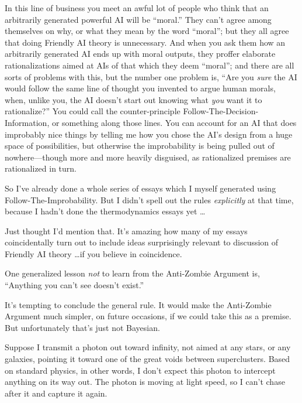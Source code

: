 {
 In this line of business you meet an awful lot of people who think
that an arbitrarily generated powerful AI will be
``moral.'' They
can't agree among themselves on why, or what they mean
by the word ``moral''; but they all
agree that doing Friendly AI theory is unnecessary. And when you ask
them how an arbitrarily generated AI ends up with moral outputs, they
proffer elaborate rationalizations aimed at AIs of that which they deem
``moral''; and there are all sorts
of problems with this, but the number one problem is,
``Are you \textit{sure} the AI would follow the same
line of thought you invented to argue human morals, when, unlike you,
the AI doesn't start out knowing what \textit{you} want
it to rationalize?'' You could call the
counter-principle Follow-The-Decision-Information, or something along
those lines. You can account for an AI that does improbably nice things
by telling me how you chose the AI's design from a huge
space of possibilities, but otherwise the improbability is being pulled
out of nowhere---though more and more heavily disguised, as
rationalized premises are rationalized in turn.}

{
 So I've already done a whole series of essays
which I myself generated using Follow-The-Improbability. But I
didn't spell out the rules \textit{explicitly} at that
time, because I hadn't done the thermodynamics essays
yet \ldots}

{
 Just thought I'd mention that.
It's amazing how many of my essays coincidentally turn
out to include ideas surprisingly relevant to discussion of Friendly AI
theory \ldots if you believe in coincidence.}

\myendsectiontext


\bigskip


{
 One generalized lesson \textit{not} to learn from the Anti-Zombie
Argument is, ``Anything you can't see
doesn't exist.'' }

{
 It's tempting to conclude the general rule. It
would make the Anti-Zombie Argument much simpler, on future occasions,
if we could take this as a premise. But unfortunately
that's just not Bayesian.}

{
 Suppose I transmit a photon out toward infinity, not aimed at any
stars, or any galaxies, pointing it toward one of the great voids
between superclusters. Based on standard physics, in other words, I
don't expect this photon to intercept anything on its
way out. The photon is moving at light speed, so I
can't chase after it and capture it again.}

